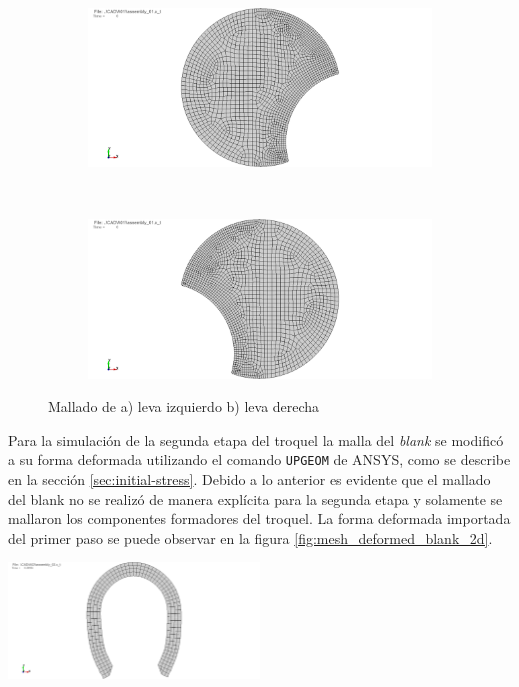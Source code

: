 \begin{figure}[H]
\centering
\begin{subfigure}[t]{0.4\textwidth}
	\centering
	\includegraphics[width=\textwidth]{src/ch3/mesh_leva_izq_2d.png}
	\caption{}
	\label{fig:mesh_leva_izq_2d}
\end{subfigure}
~ 
\begin{subfigure}[t]{0.4\textwidth}
	\centering
	\includegraphics[width=\textwidth]{src/ch3/mesh_leva_der_2d.png}
	\caption{}
	\label{fig:mesh_leva_der_2d}
\end{subfigure}
\caption{Mallado de a) leva izquierdo b) leva derecha}
\end{figure}

Para la simulación de la segunda etapa del troquel la malla del \textit{blank} se modificó a su forma deformada 
utilizando el comando \texttt{UPGEOM} de ANSYS\faCopyright, como se describe en la sección \ref{sec:initial-stress}. 
Debido a lo anterior es evidente que el mallado del blank no se realizó de manera explícita para la segunda etapa 
y solamente se mallaron los componentes formadores del troquel. La forma deformada importada del primer paso 
se puede observar en la figura \ref{fig:mesh_deformed_blank_2d}.  \\

\begin{center}
\includegraphics[width=0.5\textwidth]{src/ch3/mesh_deformed_blank_2d.png}
\label{fig:mesh_deformed_blank_2d}
\end{center}

